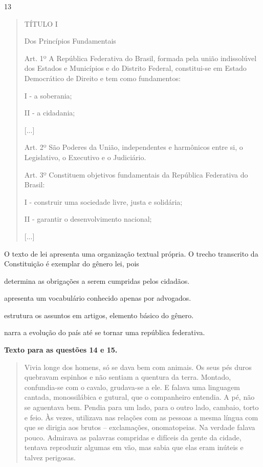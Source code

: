 \num{13}

\begin{quote}
TÍTULO I

Dos Princípios Fundamentais

Art. 1º A República Federativa do Brasil, formada pela união
indissolúvel dos Estados e Municípios e do Distrito Federal,
constitui-se em Estado Democrático de Direito e tem como fundamentos:

I - a soberania;

II - a cidadania;

{[}...{]}

Art. 2º São Poderes da União, independentes e harmônicos entre si, o
Legislativo, o Executivo e o Judiciário.

Art. 3º Constituem objetivos fundamentais da República Federativa do
Brasil:

I - construir uma sociedade livre, justa e solidária;

II - garantir o desenvolvimento nacional;

{[}...{]}
\end{quote}

O texto de lei apresenta uma organização textual própria. O trecho
transcrito da Constituição é exemplar do gênero lei, pois

\begin{escolha}
\item determina as obrigações a serem cumpridas pelos cidadãos.

\item apresenta um vocabulário conhecido apenas por advogados.

\item estrutura os assuntos em artigos, elemento básico do gênero.

\item narra a evolução do país até se tornar uma república federativa.
\end{escolha}

\textbf{Texto para as questões 14 e 15.}

\begin{quote}
Vivia longe dos homens, só se dava bem com animais. Os seus pés duros
quebravam espinhos e não sentiam a quentura da terra. Montado,
confundia-se com o cavalo, grudava-se a ele. E falava uma linguagem
cantada, monossilábica e gutural, que o companheiro entendia. A pé, não
se aguentava bem. Pendia para um lado, para o outro lado, cambaio, torto
e feio. Às vezes, utilizava nas relações com as pessoas a mesma língua
com que se dirigia aos brutos -- exclamações, onomatopeias. Na verdade
falava pouco. Admirava as palavras compridas e difíceis da gente da
cidade, tentava reproduzir algumas em vão, mas sabia que elas eram
inúteis e talvez perigosas.
\end{quote}

